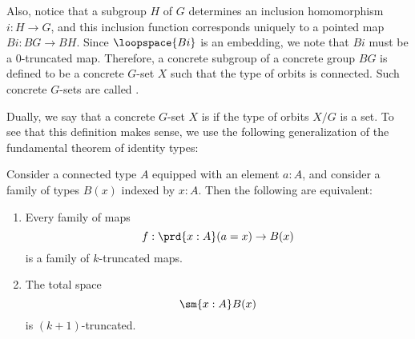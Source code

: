 Also, notice that a subgroup $H$ of $G$ determines an inclusion homomorphism $i:H\to G$, and this inclusion function corresponds uniquely to a pointed map $Bi:BG\to BH$. Since $\loopspace{Bi}$ is an embedding, we note that $Bi$ must be a $0$-truncated map. Therefore, a concrete subgroup of a concrete group $BG$ is defined to be a concrete $G$-set $X$ such that the type of orbits is connected. Such concrete $G$-sets are called .

Dually, we say that a concrete $G$-set $X$ is  if the type of orbits $X/G$ is a set. To see that this definition makes sense, we use the following generalization of the fundamental theorem of identity types:

\begin{thm}\label{thm:truncated-fundamental}
  Consider a connected type $A$ equipped with an element $a:A$, and consider a family of types $B(x)$ indexed by $x:A$. Then the following are equivalent:
  \begin{enumerate}
  \item Every family of maps
    \begin{equation*}
      f:\prd{x:A}(a=x)\to B(x)
    \end{equation*}
    is a family of $k$-truncated maps.
  \item The total space
    \begin{equation*}
      \sm{x:A}B(x)
    \end{equation*}
    is $(k+1)$-truncated.
  \end{enumerate}
\end{thm}

